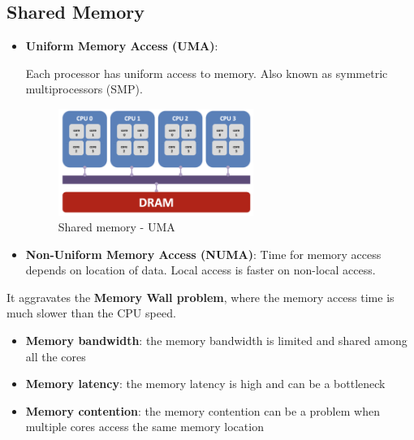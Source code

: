 \subsection*{Shared Memory}
\begin{itemize}
    \item \textbf{Uniform Memory Access (UMA)}: 

    Each processor has uniform access to memory. Also known as symmetric multiprocessors (SMP).
    \begin{figure}[H]
        \centering
        \includegraphics[width=0.6\textwidth]{assets/fig10.png}
        \caption{Shared memory - UMA}
        \label{fig:shared_memory}
    \end{figure}

    \item \textbf{Non-Uniform Memory Access (NUMA)}: Time for memory access depends on location of data. Local access is faster on non-local access. 
\end{itemize}

\begin{warningblock}
    It aggravates the \textbf{Memory Wall problem}, where the memory access time is much slower than the CPU speed.
    \begin{itemize}
        \item \textbf{Memory bandwidth}: the memory bandwidth is limited and shared among all the cores
        \item \textbf{Memory latency}: the memory latency is high and can be a bottleneck
        \item \textbf{Memory contention}: the memory contention can be a problem when multiple cores access the same memory location
    \end{itemize}
\end{warningblock}

